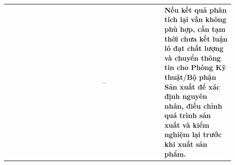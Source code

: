 \begin{landscape}
\begin{longtable}{|>{\raggedright\arraybackslash}p{0.18\linewidth}|>{\raggedright\arraybackslash}p{0.20\linewidth}|>{\raggedright\arraybackslash}p{0.25\linewidth}|>{\raggedright\arraybackslash}p{0.29\linewidth}|}
&
& --
& \textbf{Nếu kết quả phân tích lại vẫn không phù hợp, cần tạm thời chưa kết luận lô đạt chất lượng và chuyển thông tin cho Phòng Kỹ thuật/Bộ phận Sản xuất để xác định nguyên nhân, điều chỉnh quá trình sản xuất và kiểm nghiệm lại trước khi xuất sản phẩm.} \\

\end{longtable}
\endgroup
\end{landscape}
